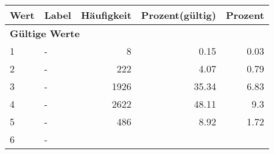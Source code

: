      \begin{longtable}{lXrrr}
     \toprule
     \textbf{Wert} & \textbf{Label} & \textbf{Häufigkeit} & \textbf{Prozent(gültig)} & \textbf{Prozent} \\
     \endhead
     \midrule
     \multicolumn{5}{l}{\textbf{Gültige Werte}}\\

     1 &
     \multicolumn{1}{X}{ -  } &


       \num{8} &
       \num[round-mode=places,round-precision=2]{0.15} &
         \num[round-mode=places,round-precision=2]{0.03} \\

     2 &
     \multicolumn{1}{X}{ -  } &


       \num{222} &
       \num[round-mode=places,round-precision=2]{4.07} &
         \num[round-mode=places,round-precision=2]{0.79} \\

     3 &
     \multicolumn{1}{X}{ -  } &


       \num{1926} &
       \num[round-mode=places,round-precision=2]{35.34} &
         \num[round-mode=places,round-precision=2]{6.83} \\

     4 &
     \multicolumn{1}{X}{ -  } &


       \num{2622} &
       \num[round-mode=places,round-precision=2]{48.11} &
         \num[round-mode=places,round-precision=2]{9.3} \\

     5 &
     \multicolumn{1}{X}{ -  } &


       \num{486} &
       \num[round-mode=places,round-precision=2]{8.92} &
         \num[round-mode=places,round-precision=2]{1.72} \\

     6 &
     \multicolumn{1}{X}{ -  } &



\end{longtable}

